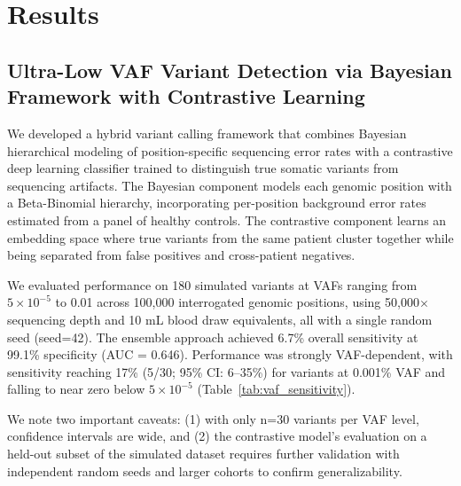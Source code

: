 \documentclass[10pt,a4paper]{article}
\begin{document}
\section{Results}

\subsection{Ultra-Low VAF Variant Detection via Bayesian Framework with Contrastive Learning}

We developed a hybrid variant calling framework that combines Bayesian hierarchical modeling of position-specific sequencing error rates with a contrastive deep learning classifier trained to distinguish true somatic variants from sequencing artifacts. The Bayesian component models each genomic position with a Beta-Binomial hierarchy, incorporating per-position background error rates estimated from a panel of healthy controls. The contrastive component learns an embedding space where true variants from the same patient cluster together while being separated from false positives and cross-patient negatives.

We evaluated performance on 180 simulated variants at VAFs ranging from $5 \times 10^{-5}$ to 0.01 across 100,000 interrogated genomic positions, using 50,000$\times$ sequencing depth and 10 mL blood draw equivalents, all with a single random seed (seed=42). The ensemble approach achieved 6.7\% overall sensitivity at 99.1\% specificity (AUC = 0.646). Performance was strongly VAF-dependent, with sensitivity reaching 17\% (5/30; 95\% CI: 6--35\%) for variants at 0.001\% VAF and falling to near zero below $5 \times 10^{-5}$ (Table~\ref{tab:vaf_sensitivity}).

We note two important caveats: (1) with only n=30 variants per VAF level, confidence intervals are wide, and (2) the contrastive model's evaluation on a held-out subset of the simulated dataset requires further validation with independent random seeds and larger cohorts to confirm generalizability.
\end{document}
